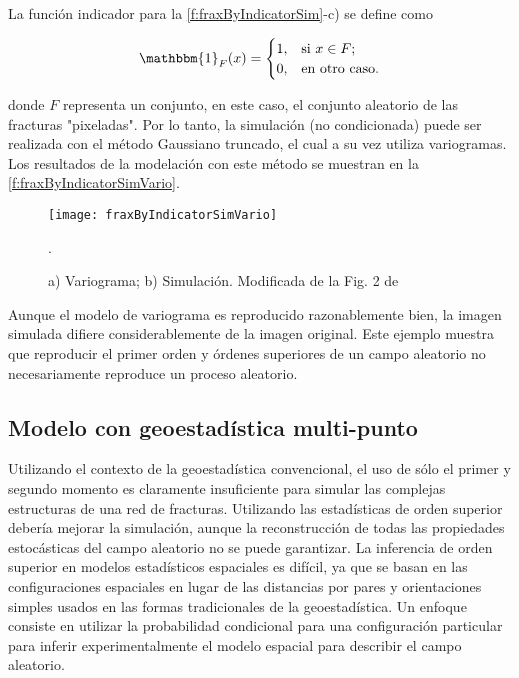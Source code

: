 La funci\'on indicador para la \autoref{f:fraxByIndicatorSim}-c) se define como

\begin{equation}
    \mathbbm{1}_{F}(x)=
\begin{cases}
	1,	& \text{si $x \in F$;}\\
	0,	& \text{en otro caso.}
\end{cases}
\label{e:indicatorFunc}
\end{equation}

\noindent
donde $F$ representa un conjunto, en este caso, el conjunto aleatorio de las fracturas "pixeladas". Por lo tanto, la simulaci\'on (no condicionada) puede ser realizada con el m\'etodo Gaussiano truncado, el cual a su vez utiliza variogramas. Los resultados de la modelaci\'on con este m\'etodo se muestran en la \autoref{f:fraxByIndicatorSimVario}.

\begin{figure}[H] 
	\centering
	\texttt{[image: fraxByIndicatorSimVario]}
        \caption{a) Variograma; b) Simulaci\'on. Modificada de la Fig. 2 de \citet{dowd_comparison_2007}}.
	\label{f:fraxByIndicatorSimVario}
\end{figure}

Aunque el modelo de variograma es reproducido razonablemente bien, la imagen simulada difiere considerablemente de la imagen original. Este ejemplo muestra que reproducir el primer orden y \'ordenes superiores de un campo aleatorio no necesariamente reproduce un proceso aleatorio.


\subsection{Modelo con geoestad\'istica multi-punto}

Utilizando el contexto de la geoestad\'istica convencional, el uso de s\'olo el primer y segundo momento es claramente insuficiente para simular las complejas estructuras de una red de fracturas. Utilizando las estad\'isticas de orden superior deber\'ia mejorar la simulaci\'on, aunque la reconstrucci\'on de todas las propiedades estoc\'asticas del campo aleatorio no se puede garantizar. La inferencia de orden superior en modelos estad\'isticos espaciales es dif\'icil, ya que se basan en las configuraciones espaciales en lugar de las distancias por pares y orientaciones simples usados en las formas tradicionales de la geoestad\'istica. Un enfoque consiste en utilizar la probabilidad condicional para una configuraci\'on particular para inferir experimentalmente el modelo espacial para describir el campo aleatorio.

